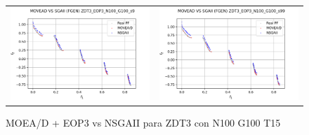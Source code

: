 \begin{figure}[H]
\begin{tabular}{c c}
    \includegraphics[scale=0.5]{figures/ZDT3_EOP3_N100_G100_T15/s9_comp.png} &
    \includegraphics[scale=0.5]{figures/ZDT3_EOP3_N100_G100_T15/s99_comp.png}\\
    \end{tabular}
    \caption{\centering MOEA/D + EOP3 vs NSGAII para ZDT3 con N100 G100 T15}
    \label{fig:3}
\end{figure}

